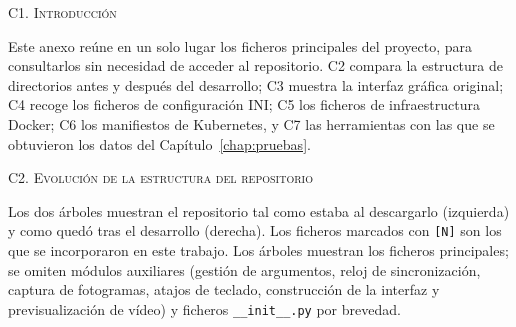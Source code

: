 \label{anexo:repositorio}
\vspace{0cm}

\Large{\textsc{\textcolor{nar}{C1. Introducción}}}
\vspace{0.2cm}

\normalsize{Este anexo reúne en un solo lugar los ficheros principales del proyecto, para
consultarlos sin necesidad de acceder al repositorio. C2 compara la estructura de directorios
antes y después del desarrollo; C3 muestra la interfaz gráfica original; C4 recoge los
ficheros de configuración INI; C5 los ficheros de infraestructura Docker; C6 los manifiestos
de Kubernetes, y C7 las herramientas con las que se obtuvieron los datos del
Capítulo~\ref{chap:pruebas}.}
\vspace{0.4cm}

\Large{\textsc{\textcolor{nar}{C2. Evolución de la estructura del repositorio}}}
\vspace{0.2cm}

\normalsize{Los dos árboles muestran el repositorio tal como estaba al descargarlo (izquierda) y
como quedó tras el desarrollo (derecha). Los ficheros marcados con \texttt{[N]} son los que
se incorporaron en este trabajo. Los árboles muestran los ficheros principales; se omiten
módulos auxiliares (gestión de argumentos, reloj de sincronización, captura de
fotogramas, atajos de teclado, construcción de la interfaz y previsualización de
vídeo) y ficheros \texttt{\_\_init\_\_.py} por brevedad.}
\vspace{0.3cm}

